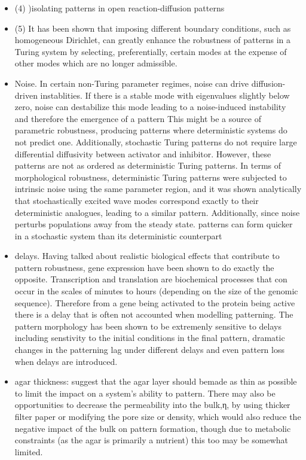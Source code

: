 \begin{itemize}
\begin{itemize}
        \item (4) )isolating patterns in open reaction-diffusion patterns
        \item  (5) It has been shown that imposing different boundary conditions, such as homogeneous Dirichlet, can greatly enhance the robustness of patterns in a Turing system by selecting, preferentially, certain modes at the expense of other modes which are no longer admissible.%
    \item Noise. In certain non-Turing parameter regimes, noise can drive diffusion-driven instablities. If there is a stable mode with eigenvalues slightly below zero, noise can destabilize this mode leading to a noise-induced instability and therefore the emergence of a pattern This might be a source of parametric robustness, producing patterns where deterministic systems do not predict one. Additionally, stochastic Turing patterns do not require large differential diffusivity between activator and inhibitor. However, these patterns are not as ordered as deterministic Turing patterns.  %
    In terms of morphological robustness, deterministic Turing patterns were subjected to intrinsic noise using the same parameter region, and it was shown analytically that stochastically excited wave modes correspond exactly to their deterministic analogues, leading to a similar pattern. Additionally, since noise perturbs populations away from the steady state. patterns can form quicker in a stochastic system than its deterministic counterpart ~\parencite{Maini2012}
    \item delays. Having talked about realistic biological effects that contribute to pattern robustness, gene expression have been shown to do exactly the opposite. Transcription and translation are biochemical processes that con occur in the scales of minutes to hours (depending on the size of the genomic sequence). Therefore from a gene being activated to the protein being active there is a delay that is often not accounted when modelling patterning. The pattern morphology has been shown to be extremenly sensitive to delays including senstivity to the initial conditions in the final pattern, dramatic changes in the patterning lag under different delays and even pattern loss when delays are introduced.
    \item agar thickness: suggest that the agar layer should bemade as thin as possible to limit the impact on a system’s ability to pattern. There may also be opportunities to decrease the permeability into the bulk,η, by using thicker ﬁlter paper or modifying the pore size or density, which would also  reduce the negative impact of the bulk on pattern formation, though due to metabolic constraints (as the agar is primarily a nutrient) this too may be somewhat limited. ~\parencite{Krause2020}
\end{itemize}


\end{itemize}

